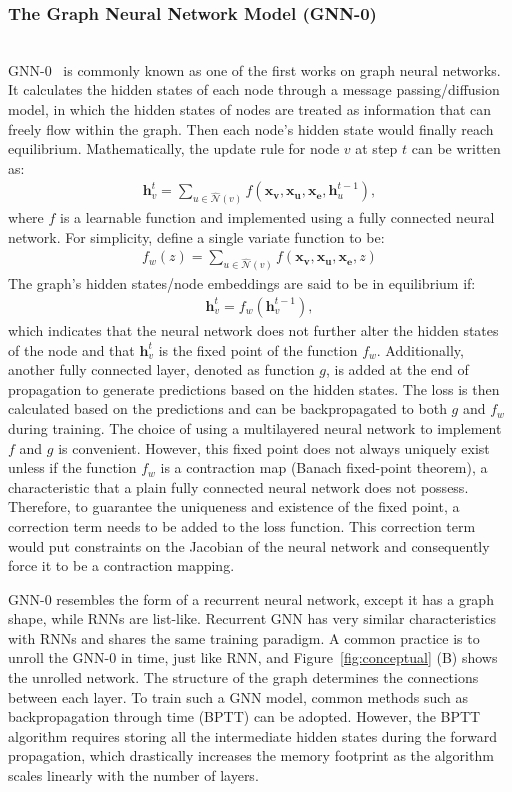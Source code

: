 \subsubsection{The Graph Neural Network Model (GNN-0)}\hfill \\
GNN-0~\cite{gnn0} is commonly known as one of the first works on graph neural networks. It calculates the hidden states of each node through a message passing/diffusion model, in which the hidden states of nodes are treated as information that can freely flow within the graph. Then each node's hidden state would finally reach equilibrium. Mathematically, the update rule for node $v$ at step $t$ can be written as:
\begin{gather}
\mathbf{h}_v ^t = \sum_{u \in \hat {\mathcal {N}}(v)} f(\mathbf{x_v}, \mathbf{x_u}, \mathbf{x_e}, \mathbf{h}_u^{t-1}),
\end{gather}
where $f$ is a learnable function and implemented using a fully connected neural network. For simplicity, define a single variate function to be:
\begin{gather}
f_w(z) = \sum_{u \in \hat {\mathcal {N}}(v)} f(\mathbf{x_v}, \mathbf{x_u}, \mathbf{x_e}, z)
\end{gather}
The graph's hidden states/node embeddings are said to be in equilibrium if:
\begin{gather}
\mathbf{h}_v ^t = f_w(\mathbf{h}_v ^{t-1}),
\end{gather}
which indicates that the neural network does not further alter the hidden states of the node and that $\mathbf{h}_v ^t$ is the fixed point of the function $f_w$. Additionally, another fully connected layer, denoted as function $g$, is added at the end of propagation to generate predictions based on the hidden states. The loss is then calculated based on the predictions and can be backpropagated to both $g$ and $f_w$ during training. The choice of using a multilayered neural network to implement $f$ and $g$ is convenient. However, this fixed point does not always uniquely exist unless if the function $f_w$ is a contraction map (Banach fixed-point theorem), a characteristic that a plain fully connected neural network does not possess. Therefore, to guarantee the uniqueness and existence of the fixed point, a correction term needs to be added to the loss function. This correction term would put constraints on the Jacobian of the neural network and consequently force it to be a contraction mapping.

GNN-0 resembles the form of a recurrent neural network, except it has a graph shape, while RNNs are list-like. Recurrent GNN has very similar characteristics with RNNs and shares the same training paradigm. A common practice is to unroll the GNN-0 in time, just like RNN, and Figure~\ref{fig:conceptual} (B) shows the unrolled network. The structure of the graph determines the connections between each layer. To train such a GNN model, common methods such as backpropagation through time (BPTT) can be adopted. However, the BPTT algorithm requires storing all the intermediate hidden states during the forward propagation, which drastically increases the memory footprint as the algorithm scales linearly with the number of layers. 

